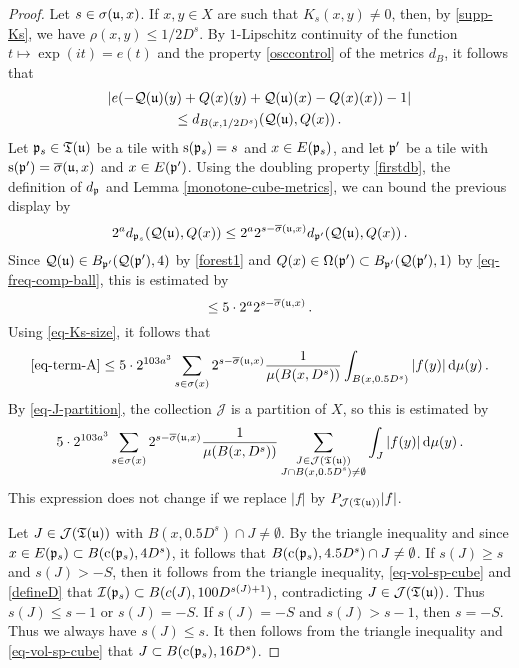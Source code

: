 {\begin{proof}
    Let $s \in \sigma({\mathfrak u},x)$.
    If $x, y \in X$ are such that $K_s(x,y)\neq 0$, then, by \eqref{supp-Ks}, we have $\rho(x,y)\leq 1/2 D^s$. By $1$-Lipschitz continuity of the function $t \mapsto \exp(it) = e(t)$ and the property \eqref{osccontrol} of the metrics $d_B$, it follows that
    \begin{multline*}
        |e(-{\mathcal{Q}}({\mathfrak u})(y)+{Q}(x)(y)+{\mathcal{Q}}({\mathfrak u})(x)-{Q}(x)(x))-1|\\
        \leq d_{B(x, 1/2 D^{s})}({\mathcal{Q}}({\mathfrak u}), {Q}(x))\,.
    \end{multline*}
    Let ${\mathfrak p}_s \in {\mathfrak T}({\mathfrak u})$ be a tile with ${\mathrm{s}}({\mathfrak p}_s) = s$ and $x \in E({\mathfrak p}_s)$, and let ${\mathfrak p}'$ be a tile with ${\mathrm{s}}({\mathfrak p}') = \overline{\sigma}({\mathfrak u}, x)$ and $x \in E({\mathfrak p}')$.
    Using the doubling property \eqref{firstdb}, the definition of $d_{{\mathfrak p}}$ and Lemma \ref{monotone-cube-metrics}, we can bound the previous display by
    $$
        2^a d_{{\mathfrak p}_s}({\mathcal{Q}}({\mathfrak u}), {Q}(x)) \le 2^{a} 2^{s - \overline{\sigma}({\mathfrak u}, x)} d_{{\mathfrak p}'}({\mathcal{Q}}({\mathfrak u}), {Q}(x))\,.
    $$
    Since ${\mathcal{Q}}({\mathfrak u}) \in B_{{\mathfrak p}'}({\mathcal{Q}}({\mathfrak p}'), 4)$ by \eqref{forest1} and ${Q}(x) \in \Omega({\mathfrak p}') \subset B_{{\mathfrak p}'}({\mathcal{Q}}({\mathfrak p}'), 1)$ by \eqref{eq-freq-comp-ball}, this is estimated by
    $$
        \le 5 \cdot 2^{a} 2^{s - \overline{\sigma}({\mathfrak u}, x)} \,.
    $$
    Using \eqref{eq-Ks-size}, it follows that
    $$
        \eqref{eq-term-A} \le 5\cdot 2^{103a^3} \sum_{s\in\sigma(x)}2^{s - \overline{\sigma}({\mathfrak u}, x)} \frac{1}{\mu(B(x,D^s))}\int_{B(x,0.5D^{s})}|f(y)|\,\mathrm{d}\mu(y)\,.
    $$
    By \eqref{eq-J-partition}, the collection $\mathcal{J}$ is a partition of $X$, so this is estimated by
    $$
         5\cdot 2^{103a^3} \sum_{s\in\sigma(x)}2^{s - \overline{\sigma}({\mathfrak u}, x)} \frac{1}{\mu(B(x,D^s))}\sum_{\substack{J \in \mathcal{J}({\mathfrak T}({\mathfrak u}))\\J \cap B(x, 0.5D^s) \ne \emptyset} }\int_{J}|f(y)|\,\mathrm{d}\mu(y)\,.
    $$
    This expression does not change if we replace $|f|$ by $P_{\mathcal{J}({\mathfrak T}({\mathfrak u}))}|f|$.

    Let $J \in \mathcal{J}({\mathfrak T}({\mathfrak u}))$ with $B(x, 0.5 D^s) \cap J \ne \emptyset$. By the triangle inequality and since $x \in E({\mathfrak p}_s) \subset B({\mathrm{c}}({\mathfrak p}_s), 4D^{s})$, it follows that $B({\mathrm{c}}({\mathfrak p}_s), 4.5D^s) \cap J \ne \emptyset$. If $s(J) \ge s$ and $s(J) > -S$, then it follows from the triangle inequality, \eqref{eq-vol-sp-cube} and \eqref{defineD} that ${\mathcal{I}}({\mathfrak p}_s) \subset B(c(J), 100 D^{s(J)+1})$, contradicting $J \in \mathcal{J}(\mathfrak{T}({\mathfrak u}))$. Thus $s(J) \le s - 1$ or $s(J) = -S$. If $s(J) = -S$ and $s(J) > s - 1$, then $s = -S$. Thus we always have $s(J) \le s$. It then follows from the triangle inequality and \eqref{eq-vol-sp-cube} that $J \subset B({\mathrm{c}}({\mathfrak p}_s), 16 D^s)$.


\end{proof}}
